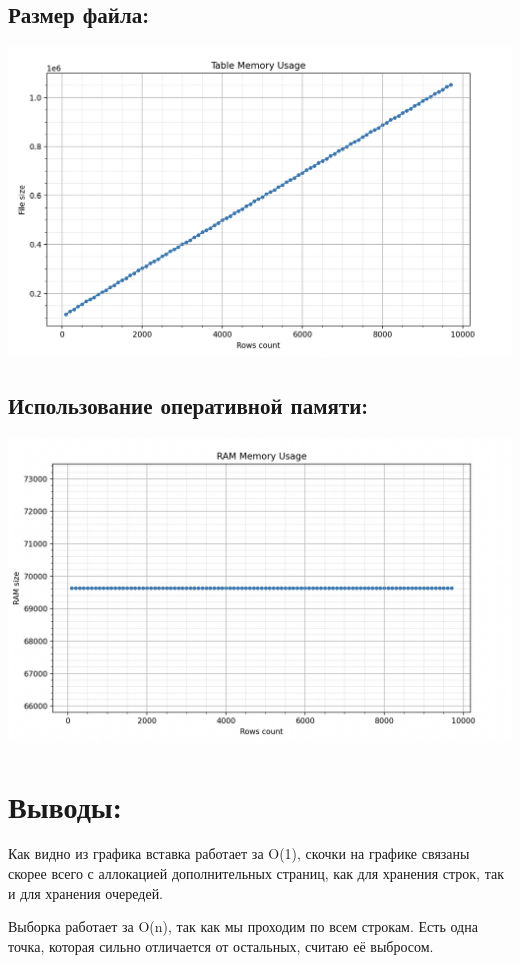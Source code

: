 \documentclass[12pt,onecolumn]{article}
\begin{document}
\subsection{Размер файла:}
\includegraphics[width=\textwidth]{image/mem.png}
\subsection{Использование оперативной памяти:}
\includegraphics[width=\textwidth]{image/ram.png}
\section{Выводы:}
Как видно из графика вставка работает за O(1), скочки на графике связаны скорее всего с аллокацией дополнительных страниц, как для хранения строк, так и для хранения очередей. 

Выборка работает за O(n), так как мы проходим по всем строкам. Есть одна точка, которая сильно отличается от остальных, считаю её выбросом.
\end{document}
